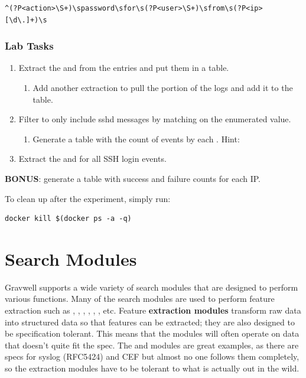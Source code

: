 \begin{Verbatim}[breaklines=true]
^(?P<action>\S+)\spassword\sfor\s(?P<user>\S+)\sfrom\s(?P<ip>[\d\.]+)\s
\end{Verbatim}

\subsubsection{Lab Tasks}

\begin{enumerate}
\item
  Extract the  and  from the entries and put them in a
  table.
	\begin{enumerate}
	\item
	  Add another extraction to pull the  portion of the logs and
	  add it to the table.
	\end{enumerate}
\item
  Filter to only include sshd messages by matching on the  enumerated value.
	\begin{enumerate}
	\item
	  Generate a table with the count of  events by each . Hint: 
	\end{enumerate}
\item
  Extract the  and  for all SSH login events.
\end{enumerate}

\textbf{BONUS}: generate a table with success and failure counts for each IP.

To clean up after the experiment, simply run:

\begin{Verbatim}[breaklines=true]
docker kill $(docker ps -a -q)
\end{Verbatim}


\section{Search Modules}
Gravwell supports a wide variety of search modules that are designed to
perform various functions. Many of the search modules are used to
perform feature extraction such as , , ,
, , , etc. Feature \textbf{extraction modules}
transform raw data into structured data so that features can be
extracted; they are also designed to be specification tolerant. This
means that the modules will often operate on data that doesn't quite fit
the spec. The  and  modules are great examples, as there
are specs for syslog (RFC5424) and CEF but almost no one follows them
completely, so the extraction modules have to be tolerant to what is
actually out in the wild.

